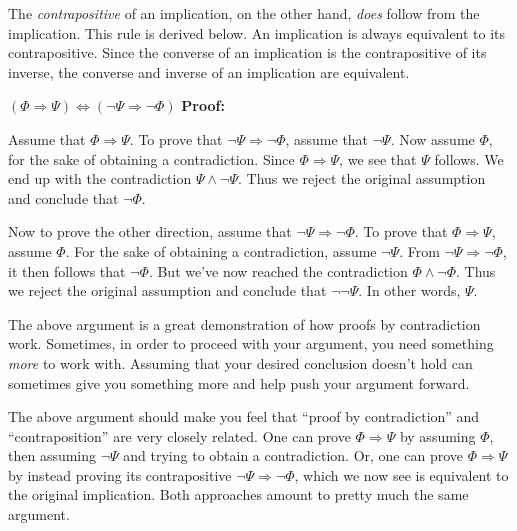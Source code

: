 \documentclass[12pt]{article}
\newcommand{\AND}{\wedge}
\newcommand{\ARR}{\Rightarrow}
\newcommand{\DARR}{\Leftrightarrow}
\newcounter{rule}
\def\putRuleNumber{\refstepcounter{rule}\therule}
\newcommand{\DRULEPF}[3]{\begin{tcolorbox}[title=Derived Rule \putRuleNumber: #1,colbacktitle=white,coltitle=black,colback=white] {#2} \tcblower \textbf{Proof:} {#3} \end{tcolorbox}}
\def\pA{\Phi}
\def\pB{\Psi}
\def\pC{\Omega}
\def\pD{\Sigma}
\begin{document}
The \emph{contrapositive} of an implication, on the other hand, \emph{does} follow from the implication.
This rule is derived below.
An implication is always equivalent to its contrapositive.
Since the converse of an implication is the contrapositive of its inverse, the converse and inverse of an implication are equivalent.






\DRULEPF{Contraposition\label{drule:contraposition}}{$(\pA\ARR\pB)\DARR(\neg\pB\ARR\neg\pA)$}{
Assume that $\pA\ARR\pB$.
To prove that $\neg\pB\ARR\neg\pA$, assume that $\neg\pB$.
Now assume $\pA$, for the sake of obtaining a contradiction.
Since $\pA\ARR\pB$, we see that $\pB$ follows. We end up with the contradiction $\pB\AND\neg\pB$.
Thus we reject the original assumption and conclude that $\neg\pA$.
\lsp

Now to prove the other direction, assume that $\neg\pB\ARR\neg\pA$.
To prove that $\pA\ARR\pB$, assume $\pA$.
For the sake of obtaining a contradiction, assume $\neg\pB$.
From $\neg\pB\ARR\neg\pA$, it then follows that $\neg\pA$.
But we've now reached the contradiction $\pA\AND\neg\pA$.
Thus we reject the original assumption and conclude that $\neg\neg\pB$.
In other words, $\pB$.
}

The above argument is a great demonstration of how proofs by contradiction work.
Sometimes, in order to proceed with your argument, you need something \emph{more} to work with.
Assuming that your desired conclusion doesn't hold can sometimes give you something more and help push your argument forward.

The above argument should make you feel that ``proof by contradiction'' and ``contraposition'' are very closely related.
One can prove $\pA\ARR\pB$ by assuming $\pA$, then assuming $\neg\pB$ and trying to obtain a contradiction.
Or, one can prove $\pA\ARR\pB$ by instead proving its contrapositive $\neg\pB\ARR\neg\pA$, which we now see is equivalent to the original implication.
Both approaches amount to pretty much the same argument.

\vspace{1em}
\end{document}

